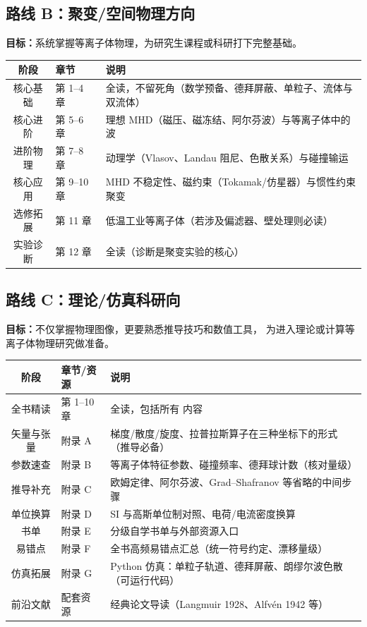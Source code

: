 \documentclass[12pt,a4paper,openany,oneside]{book}
\newcommand{\difficulty}[1]{\marginnote{\hfill\textcolor{coverMid!80}{\rule[-0.1em]{2pt}{0.9em}}\,\textcolor{coverMid}{\footnotesize\textbf{[#1]}}}}
\begin{document}
\subsection*{路线 B：聚变/空间物理方向}

\textbf{目标：}系统掌握等离子体物理，为研究生课程或科研打下完整基础。

\begin{table}[htbp]
\centering
\begin{tabular}{@{}clp{6cm}@{}}
\toprule
\textbf{阶段} & \textbf{章节} & \textbf{说明} \\
\midrule
核心基础 & 第 1--4 章 & 全读，不留死角（数学预备、德拜屏蔽、单粒子、流体与双流体） \\
核心进阶 & 第 5--6 章 & 理想 MHD（磁压、磁冻结、阿尔芬波）与等离子体中的波 \\
进阶物理 & 第 7--8 章 & 动理学（Vlasov、Landau 阻尼、色散关系）与碰撞输运 \\
核心应用 & 第 9--10 章 & MHD 不稳定性、磁约束（Tokamak/仿星器）与惯性约束聚变 \\
选修拓展 & 第 11 章 & 低温工业等离子体（若涉及偏滤器、壁处理则必读） \\
实验诊断 & 第 12 章 & 全读（诊断是聚变实验的核心） \\
\bottomrule
\end{tabular}
\end{table}


\subsection*{路线 C：理论/仿真科研向}

\textbf{目标：}不仅掌握物理图像，更要熟悉推导技巧和数值工具，
为进入理论或计算等离子体物理研究做准备。

\begin{table}[htbp]
\centering
\begin{tabular}{@{}clp{6cm}@{}}
\toprule
\textbf{阶段} & \textbf{章节/资源} & \textbf{说明} \\
\midrule
全书精读 & 第 1--10 章 & 全读，包括所有\,\difficulty{挑战}\,内容 \\
矢量与张量 & 附录 A & 梯度/散度/旋度、拉普拉斯算子在三种坐标下的形式（推导必备） \\
参数速查 & 附录 B & 等离子体特征参数、碰撞频率、德拜球计数（核对量级） \\
推导补充 & 附录 C & 欧姆定律、阿尔芬波、Grad--Shafranov 等省略的中间步骤 \\
单位换算 & 附录 D & SI 与高斯单位制对照、电荷/电流密度换算 \\
书单 & 附录 E & 分级自学书单与外部资源入口 \\
易错点 & 附录 F & 全书高频易错点汇总（统一符号约定、漂移量级） \\
仿真拓展 & 附录 G & Python 仿真：单粒子轨道、德拜屏蔽、朗缪尔波色散（可运行代码） \\
前沿文献 & 配套资源 & 经典论文导读（Langmuir 1928、Alfv\'{e}n 1942 等） \\
\bottomrule
\end{tabular}
\end{table}
\end{document}
